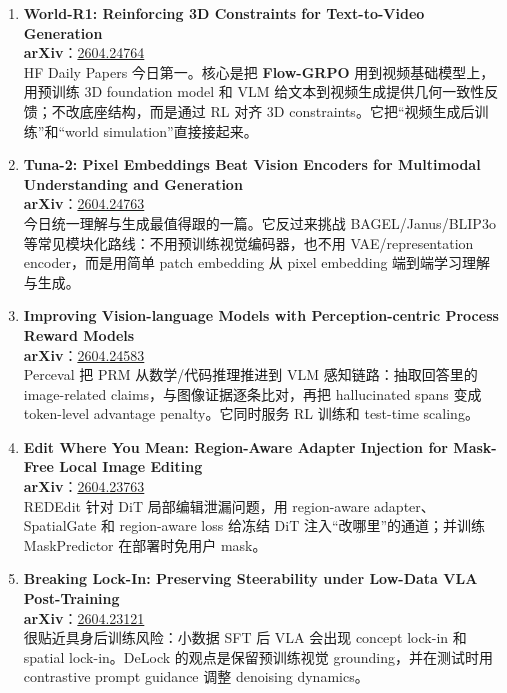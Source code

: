 \begin{enumerate}[leftmargin=1.5em]
  \item \textbf{World-R1: Reinforcing 3D Constraints for Text-to-Video Generation}\\
  \textbf{arXiv}：\href{https://arxiv.org/abs/2604.24764}{2604.24764}\\
  HF Daily Papers 今日第一。核心是把 \textbf{Flow-GRPO} 用到视频基础模型上，用预训练 3D foundation model 和 VLM 给文本到视频生成提供几何一致性反馈；不改底座结构，而是通过 RL 对齐 3D constraints。它把“视频生成后训练”和“world simulation”直接接起来。

  \item \textbf{Tuna-2: Pixel Embeddings Beat Vision Encoders for Multimodal Understanding and Generation}\\
  \textbf{arXiv}：\href{https://arxiv.org/abs/2604.24763}{2604.24763}\\
  今日统一理解与生成最值得跟的一篇。它反过来挑战 BAGEL/Janus/BLIP3o 等常见模块化路线：不用预训练视觉编码器，也不用 VAE/representation encoder，而是用简单 patch embedding 从 pixel embedding 端到端学习理解与生成。

  \item \textbf{Improving Vision-language Models with Perception-centric Process Reward Models}\\
  \textbf{arXiv}：\href{https://arxiv.org/abs/2604.24583}{2604.24583}\\
  Perceval 把 PRM 从数学/代码推理推进到 VLM 感知链路：抽取回答里的 image-related claims，与图像证据逐条比对，再把 hallucinated spans 变成 token-level advantage penalty。它同时服务 RL 训练和 test-time scaling。

  \item \textbf{Edit Where You Mean: Region-Aware Adapter Injection for Mask-Free Local Image Editing}\\
  \textbf{arXiv}：\href{https://arxiv.org/abs/2604.23763}{2604.23763}\\
  REDEdit 针对 DiT 局部编辑泄漏问题，用 region-aware adapter、SpatialGate 和 region-aware loss 给冻结 DiT 注入“改哪里”的通道；并训练 MaskPredictor 在部署时免用户 mask。

  \item \textbf{Breaking Lock-In: Preserving Steerability under Low-Data VLA Post-Training}\\
  \textbf{arXiv}：\href{https://arxiv.org/abs/2604.23121}{2604.23121}\\
  很贴近具身后训练风险：小数据 SFT 后 VLA 会出现 concept lock-in 和 spatial lock-in。DeLock 的观点是保留预训练视觉 grounding，并在测试时用 contrastive prompt guidance 调整 denoising dynamics。
\end{enumerate}

